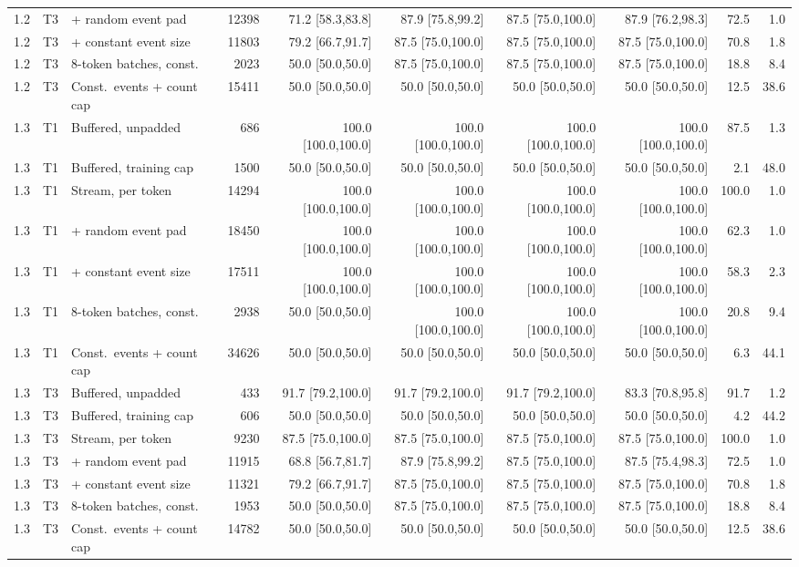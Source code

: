 \begin{table}[!ht]
\begin{tabular}{@{}lllrrrrrrr@{}}
1.2 & T3 & + random event pad & 12398 & 71.2 [58.3,83.8] & 87.9 [75.8,99.2] & 87.5 [75.0,100.0] & 87.9 [76.2,98.3] & 72.5 & 1.0\\
1.2 & T3 & + constant event size & 11803 & 79.2 [66.7,91.7] & 87.5 [75.0,100.0] & 87.5 [75.0,100.0] & 87.5 [75.0,100.0] & 70.8 & 1.8\\
1.2 & T3 & 8-token batches, const. & 2023 & 50.0 [50.0,50.0] & 87.5 [75.0,100.0] & 87.5 [75.0,100.0] & 87.5 [75.0,100.0] & 18.8 & 8.4\\
1.2 & T3 & Const.\ events + count cap & 15411 & 50.0 [50.0,50.0] & 50.0 [50.0,50.0] & 50.0 [50.0,50.0] & 50.0 [50.0,50.0] & 12.5 & 38.6\\
1.3 & T1 & Buffered, unpadded & 686 & 100.0 [100.0,100.0] & 100.0 [100.0,100.0] & 100.0 [100.0,100.0] & 100.0 [100.0,100.0] & 87.5 & 1.3\\
1.3 & T1 & Buffered, training cap & 1500 & 50.0 [50.0,50.0] & 50.0 [50.0,50.0] & 50.0 [50.0,50.0] & 50.0 [50.0,50.0] & 2.1 & 48.0\\
1.3 & T1 & Stream, per token & 14294 & 100.0 [100.0,100.0] & 100.0 [100.0,100.0] & 100.0 [100.0,100.0] & 100.0 [100.0,100.0] & 100.0 & 1.0\\
1.3 & T1 & + random event pad & 18450 & 100.0 [100.0,100.0] & 100.0 [100.0,100.0] & 100.0 [100.0,100.0] & 100.0 [100.0,100.0] & 62.3 & 1.0\\
1.3 & T1 & + constant event size & 17511 & 100.0 [100.0,100.0] & 100.0 [100.0,100.0] & 100.0 [100.0,100.0] & 100.0 [100.0,100.0] & 58.3 & 2.3\\
1.3 & T1 & 8-token batches, const. & 2938 & 50.0 [50.0,50.0] & 100.0 [100.0,100.0] & 100.0 [100.0,100.0] & 100.0 [100.0,100.0] & 20.8 & 9.4\\
1.3 & T1 & Const.\ events + count cap & 34626 & 50.0 [50.0,50.0] & 50.0 [50.0,50.0] & 50.0 [50.0,50.0] & 50.0 [50.0,50.0] & 6.3 & 44.1\\
1.3 & T3 & Buffered, unpadded & 433 & 91.7 [79.2,100.0] & 91.7 [79.2,100.0] & 91.7 [79.2,100.0] & 83.3 [70.8,95.8] & 91.7 & 1.2\\
1.3 & T3 & Buffered, training cap & 606 & 50.0 [50.0,50.0] & 50.0 [50.0,50.0] & 50.0 [50.0,50.0] & 50.0 [50.0,50.0] & 4.2 & 44.2\\
1.3 & T3 & Stream, per token & 9230 & 87.5 [75.0,100.0] & 87.5 [75.0,100.0] & 87.5 [75.0,100.0] & 87.5 [75.0,100.0] & 100.0 & 1.0\\
1.3 & T3 & + random event pad & 11915 & 68.8 [56.7,81.7] & 87.9 [75.8,99.2] & 87.5 [75.0,100.0] & 87.5 [75.4,98.3] & 72.5 & 1.0\\
1.3 & T3 & + constant event size & 11321 & 79.2 [66.7,91.7] & 87.5 [75.0,100.0] & 87.5 [75.0,100.0] & 87.5 [75.0,100.0] & 70.8 & 1.8\\
1.3 & T3 & 8-token batches, const. & 1953 & 50.0 [50.0,50.0] & 87.5 [75.0,100.0] & 87.5 [75.0,100.0] & 87.5 [75.0,100.0] & 18.8 & 8.4\\
1.3 & T3 & Const.\ events + count cap & 14782 & 50.0 [50.0,50.0] & 50.0 [50.0,50.0] & 50.0 [50.0,50.0] & 50.0 [50.0,50.0] & 12.5 & 38.6\\
\bottomrule\end{tabular}\end{table}
